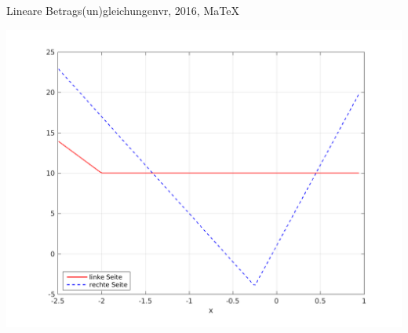 \begin{MAufgabe}{Lineare Betrags(un)gleichungen}{vr, 2016, MaTeX}
 \begin{center}
 \includegraphics[width=0.8\linewidth]{Abb_zur_Ag_autogenerated_ineq_11.png} \end{center}
 
\else\relax\fi
 \end{MAufgabe}